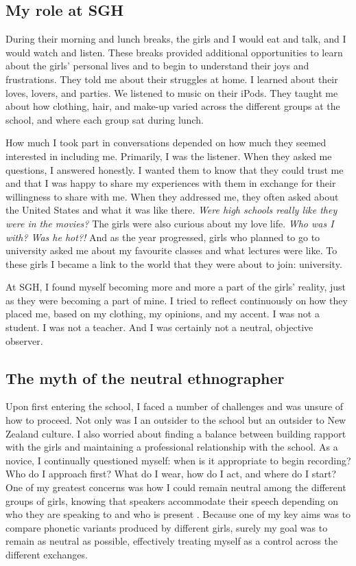 \subsection{My role at SGH}

During their morning and lunch breaks, the girls and I would eat and talk, and I would watch and listen. These breaks provided additional opportunities to learn about the girls' personal lives and to begin to understand their joys and frustrations.  They told me about their struggles at home.  I learned about their loves, lovers, and parties.  We listened to music on their iPods.  They taught me about how clothing, hair, and make-up varied across the different groups at the school, and where each group sat during lunch.

How much I took part in conversations depended on how much they seemed interested in including me.  Primarily, I was the listener.  When they asked me questions, I answered honestly.  I wanted them to know that they could trust me and that I was happy to share my experiences with them in exchange for their willingness to share with me.  When they addressed me, they often asked about the United States and what it was like there. \textit{Were high schools really like they were in the movies?} The girls were also curious about my love life.  \textit{Who was I with?  Was he hot?!}  And as the year progressed, girls who planned to go to university asked me about my favourite classes and what lectures were like.  To these girls I became a link to the world that they were about to join: university.

At SGH, I found myself becoming more and more a part of the girls' reality, just as they were becoming a part of mine.  I tried to reflect continuously on how they placed me, based on my clothing, my opinions, and my accent.  I was not a student.  I was not a teacher.  And I was certainly not a neutral, objective observer. 


\subsection{The myth of the neutral ethnographer}

Upon first entering the school, I faced a number of challenges and was unsure of how to proceed.  Not only was I an outsider to the school but an outsider to New Zealand culture.  I also worried about finding a balance between building rapport with the girls and maintaining a professional relationship with the school.  As a novice, I continually questioned myself: when is it appropriate to begin recording?  Who do I approach first?  What do I wear, how do I act, and where do I start?  One of my greatest concerns was how I could remain neutral among the different groups of girls, knowing that speakers accommodate their speech depending on who they are speaking to and who is present \cite{gilespowesland1975,bell1984,gilesetal1991}.  Because one of my key aims was to compare phonetic variants produced by different girls, surely my goal was to remain as neutral as possible, effectively treating myself as a control across the different exchanges.  

